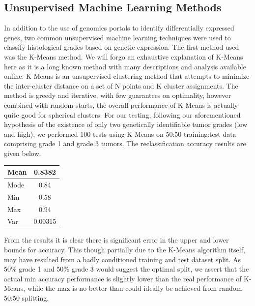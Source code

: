 \documentclass[a4paper,10pt]{article}
\begin{document}
\subsection{Unsupervised Machine Learning Methods}
In addition to the use of genomics portals to identify differentially expressed genes, two common unsupervised machine learning techniques were
used to classify histological grades based on genetic expression. The first method used was the K-Means method. We will forgo an exhaustive explanation
of K-Means here as it is a long known method with many descriptions and analysis available online. K-Means is an unsupervised clustering method
that attempts to minimize the inter-cluster distance on a set of N points and K cluster assignments. The method is greedy and iterative, with few guarantees
on optimality, however combined with random starts, the overall performance of K-Means is actually quite good for spherical clusters\cite{kmeans}. 
For our testing, following our aforementioned hypothesis of the existence of only two genetically identifiable tumor grades (low and high), we performed
100 tests using K-Means on 50:50 training:test data comprising grade 1 and grade 3 tumors. The reclassification accuracy results are given below.\\
\begin{center}
\begin{tabular}{| l | c | }
    \hline
    Mean & 0.8382  \\ \hline
    Mode & 0.84 \\ \hline
    Min & 0.58  \\ \hline
    Max & 0.94  \\ \hline
     Var &  0.00315  \\ \hline
  \end{tabular}
\end{center}

From the results it is clear there is significant error in the upper and lower bounds for accuracy. This though partially due to the K-Means algorithm
itself, may have resulted from a badly conditioned training and test dataset split. As 50\% grade 1 and 50\% grade 3 would suggest the optimal split,
we assert that the actual min accuracy performance is slightly lower than the real performance of K-Means, while the max is no better than could
ideally be achieved from random 50:50 splitting.\\
\end{document}
